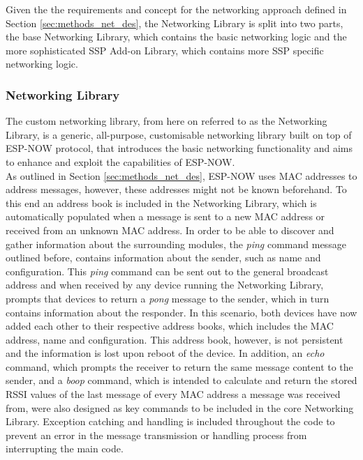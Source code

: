 
Given the the requirements and concept for the networking approach defined in Section \ref{sec:methods_net_des}, the Networking Library is split into two parts, the base Networking Library, which contains the basic networking logic and the more sophisticated SSP Add-on Library, which contains more SSP specific networking logic.

\subsubsection{\label{sec:methods_networking}Networking Library}


The custom networking library, from here on referred to as the Networking Library, is a generic, all-purpose, customisable networking library built on top of ESP-NOW protocol, that introduces the basic networking functionality and aims to enhance and exploit the capabilities of ESP-NOW. \\

As outlined in Section \ref{sec:methods_net_des}, ESP-NOW uses MAC addresses to address messages, however, these addresses might not be known beforehand. To this end an address book is included in the Networking Library, which is automatically populated when a message is sent to a new MAC address or received from an unknown MAC address. In order to be able to discover and gather information about the surrounding modules, the \textit{ping} command message outlined before, contains information about the sender, such as name and configuration. This \textit{ping} command can be sent out to the general broadcast address and when received by any device running the Networking Library, prompts that devices to return a \textit{pong} message to the sender, which in turn contains information about the responder. In this scenario, both devices have now added each other to their respective address books, which includes the MAC address, name and configuration. This address book, however, is not persistent and the information is lost upon reboot of the device. In addition, an \textit{echo} command, which prompts the receiver to return the same message content to the sender, and a \textit{boop} command, which is intended to calculate and return the stored RSSI values of the last message of every MAC address a message was received from, were also designed as key commands to be included in the core Networking Library. Exception catching and handling is included throughout the code to prevent an error in the message transmission or handling process from interrupting the main code. \\

